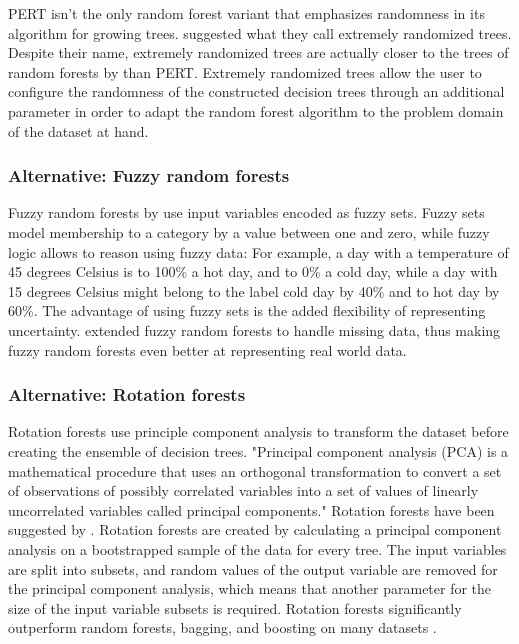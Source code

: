 \documentclass[a4paper,man,12pt,apacite,floatsintext,draftfirst]{apa6} %
\begin{document}
PERT isn't the only random forest variant that emphasizes randomness in its
algorithm for growing trees.
\cite{geurts2006extremely} suggested what they call extremely randomized trees.
Despite their name, extremely randomized trees are actually closer to the
trees of random forests by \cite{breiman2001random} than PERT.
Extremely randomized trees allow the user to configure the randomness of the
constructed decision trees through an additional parameter in order to adapt
the random forest algorithm to the problem domain of the dataset at hand.

\subsubsection{Alternative: Fuzzy random forests}
Fuzzy random forests by \cite{bonissone2008fuzzy} use input variables
encoded as fuzzy sets.
Fuzzy sets \cite{wpFS} model membership to a category by a value between
one and zero, while fuzzy logic \cite{wpFL} allows to reason using fuzzy data:
For example, a day with a temperature of 45 degrees Celsius is to 100\% a
hot day, and to 0\% a cold day, while a day with 15 degrees Celsius might
belong to the label cold day by 40\% and to hot day by 60\%.
The advantage of using fuzzy sets is the added flexibility of representing
uncertainty.
\cite{cadenas2012extending} extended fuzzy random forests to handle
missing data, thus making fuzzy random forests even better at representing
real world data.

\subsubsection{Alternative: Rotation forests}
Rotation forests use principle component analysis to transform
the dataset before creating the ensemble of decision trees.
"Principal component analysis (PCA) is a mathematical procedure that uses
an orthogonal transformation to convert a set of observations of possibly
correlated variables into a set of values of linearly uncorrelated variables
called principal components." \cite{wpPCA}
Rotation forests have been suggested by \cite{rodriguez2006rotation}.
Rotation forests are created by calculating a principal component analysis
on a bootstrapped sample of the data for every tree.
The input variables are split into subsets, and random values of the output
variable are removed for the principal component analysis, which means that
another parameter for the size of the input variable subsets is required.
Rotation forests significantly outperform random forests, bagging, and
boosting on many datasets \cite{rodriguez2006rotation}.
\end{document}
